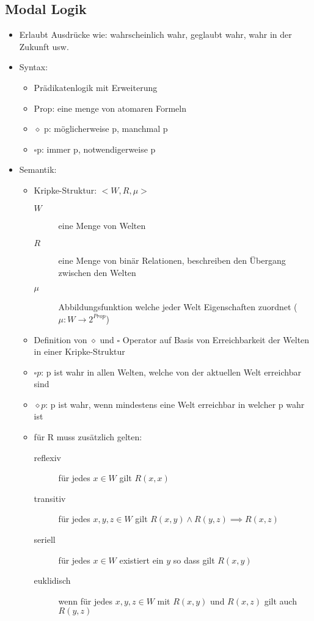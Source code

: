 \documentclass{article} %
\begin{document}
	\subsection{Modal Logik}
	\begin{itemize}
		\item Erlaubt Ausdrücke wie: wahrscheinlich wahr, geglaubt wahr, wahr in der Zukunft usw.
		\item Syntax:
		\begin{itemize}
			\item Prädikatenlogik mit Erweiterung
			\item Prop: eine menge von atomaren Formeln
			\item $\diamond$ p: möglicherweise p, manchmal p 
			\item $\square$p: immer p, notwendigerweise p
		\end{itemize}
		\item Semantik:
		\begin{itemize}
			\item Kripke-Struktur: $<W,R,\mu>$
			\begin{description}
				\item[$W$] eine Menge von Welten
				\item[$R$] eine Menge von binär Relationen, beschreiben den Übergang zwischen den Welten
				\item[$\mu$] Abbildungsfunktion welche jeder Welt Eigenschaften zuordnet ($\mu : W \rightarrow 2^{Prop}$)
			\end{description}
			\item Definition von $\diamond$ und $\square$ Operator auf Basis von Erreichbarkeit der Welten in einer Kripke-Struktur
			\item $\square p$: p ist wahr in allen Welten, welche von der aktuellen Welt erreichbar sind
			\item $\diamond p$: p ist wahr, wenn mindestens eine Welt erreichbar in welcher p wahr ist
			\item für R muss zusätzlich gelten:
			\begin{description}
				\item[reflexiv] für jedes $x \in W$ gilt $R(x,x)$
				\item[transitiv] für jedes $x,y,z \in W$ gilt $R(x,y) \wedge R(y,z) \implies R(x,z)$
				\item[seriell] für jedes $x \in W$ existiert ein $y$ so dass gilt $R(x,y)$
				\item[euklidisch] wenn für jedes $x,y,z \in W$ mit $R(x,y)$ und $R(x,z)$ gilt auch $R(y,z)$

\end{description}
\end{itemize}
\end{itemize}
\end{document}
